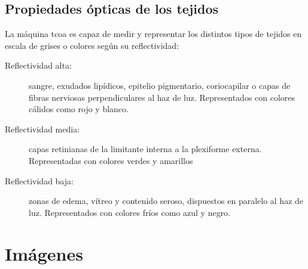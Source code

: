 \subsection{Propiedades ópticas de los tejidos}
La máquina \gls{tcoa} es capaz de medir y representar los distintos
tipos de tejidos en escala de grises o colores según su reflectividad:
\begin{description}
\item[Reflectividad alta:] sangre, exudados lipídicos, epitelio
  pigmentario, coriocapilar o capas de fibras nerviosas
  perpendiculares al haz de luz. Representados con colores cálidos
  como rojo y blanco.
\item[Reflectividad media:] capas retinianas de la limitante interna a
  la plexiforme externa. Representadas con colores verdes y amarillos
\item[Reflectividad baja:] zonas de edema, vítreo y contenido seroso,
  dispuestos en paralelo al haz de luz. Representados con colores
  fríos como azul y negro.
\end{description}
\section{Imágenes }